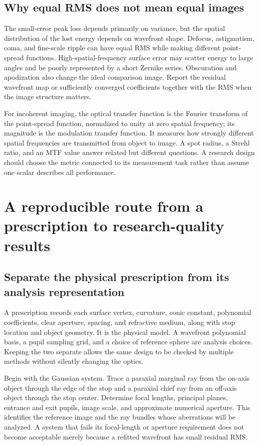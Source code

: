 \section{Why equal RMS does not mean equal images}
The small-error peak loss depends primarily on variance, but the spatial
distribution of the lost energy depends on wavefront shape. Defocus,
astigmatism, coma, and fine-scale ripple can have equal RMS while making
different point-spread functions. High-spatial-frequency surface error may
scatter energy to large angles and be poorly represented by a short Zernike
series. Obscuration and apodization also change the ideal comparison image.
Report the residual wavefront map or sufficiently converged coefficients
together with the RMS when the image structure matters.

For incoherent imaging, the optical transfer function is the Fourier transform
of the point-spread function, normalized to unity at zero spatial frequency;
its magnitude is the modulation transfer
function. It measures how strongly different spatial frequencies are
transmitted from object to image. A spot radius, a Strehl ratio, and an MTF
value answer related but different questions. A research design should choose
the metric connected to its measurement task rather than assume one scalar
describes all performance.

\chapter{A reproducible route from a prescription to research-quality results}
\label{ab:research}

\section{Separate the physical prescription from its analysis representation}
A prescription records each surface vertex, curvature, conic constant,
polynomial coefficients, clear aperture, spacing, and refractive medium, along
with stop location and object geometry. It is the physical model. A wavefront
polynomial basis, a pupil sampling grid, and a choice of reference sphere are
analysis choices. Keeping the two separate allows the same design to be
checked by multiple methods without silently changing the optics.

Begin with the Gaussian system. Trace a paraxial marginal ray from the
on-axis object through the edge of the stop and a paraxial chief ray from an
off-axis object through the stop center. Determine focal lengths, principal
planes, entrance and exit pupils, image scale, and approximate numerical
aperture. This identifies the reference image and the ray bundles whose
aberrations will be analyzed. A system that fails its focal-length or
aperture requirement does not become acceptable merely because a refitted
wavefront has small residual RMS.

